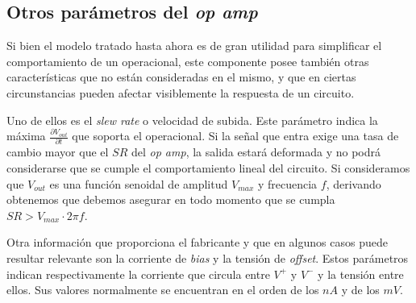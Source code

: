 \documentclass[main.tex]{subfiles}
\begin{document}


\subsection{Otros par\'ametros del \textit{op amp}}
Si bien el modelo tratado hasta ahora es de gran utilidad para simplificar el comportamiento de un operacional, este componente posee tambi\'en otras caracter\'isticas que no est\'an consideradas en el mismo, y que en ciertas circunstancias pueden afectar visiblemente la respuesta de un circuito.\par

Uno de ellos es el \textit{slew rate} o velocidad de subida. Este par\'ametro indica la m\'axima $\frac{\partial V_{out}}{\partial t}$ que soporta el operacional. Si la se\~nal que entra exige una tasa de cambio mayor que el $SR$ del \textit{op amp}, la salida estar\'a deformada y no podr\'a considerarse que se cumple el comportamiento lineal del circuito. Si consideramos que $V_{out}$ es una funci\'on senoidal de amplitud $V_{max}$ y frecuencia $f$, derivando obtenemos que debemos asegurar en todo momento que se cumpla $SR > V_{max} \cdot 2\pi f$. \par

Otra informaci\'on que proporciona el fabricante y que en algunos casos puede resultar relevante son la corriente de \textit{bias} y la tensi\'on de \textit{offset}. Estos par\'ametros indican respectivamente la corriente que circula entre $V^+$ y $V^-$ y la tensi\'on entre ellos. Sus valores normalmente se encuentran en el orden de los $nA$ y de los $mV$. \par

 
\end{document}
